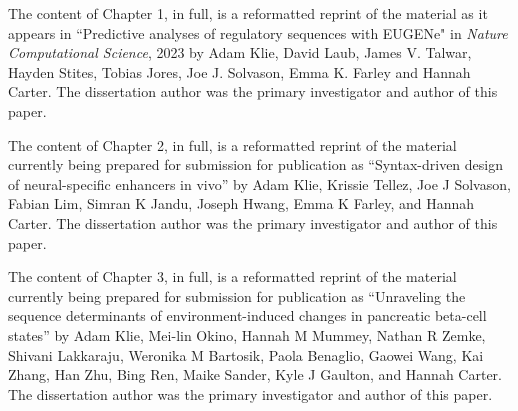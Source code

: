 \documentclass[11pt]{formatting-template}
\begin{document}

\tableofcontents
\listoffigures
\listoftables

\begin{acknowledgements}

	The content of Chapter 1, in full, is a reformatted reprint of the material as it appears in “Predictive analyses of regulatory sequences with EUGENe" in \textit{Nature Computational Science}, 2023 by Adam Klie, David Laub, James V. Talwar, Hayden Stites, Tobias Jores, Joe J. Solvason, Emma K. Farley and Hannah Carter. The dissertation author was the primary investigator and author of this paper.

	The content of Chapter 2, in full, is a reformatted reprint of the material currently being prepared for submission for publication as “Syntax-driven design of neural-specific enhancers in vivo'' by Adam Klie, Krissie Tellez, Joe J Solvason, Fabian Lim, Simran K Jandu, Joseph Hwang, Emma K Farley, and Hannah Carter. The dissertation author was the primary investigator and author of this paper.

	The content of Chapter 3, in full, is a reformatted reprint of the material currently being prepared for submission for publication as “Unraveling the sequence determinants of environment-induced changes in pancreatic beta-cell states'' by Adam Klie, Mei-lin Okino, Hannah M Mummey, Nathan R Zemke, Shivani Lakkaraju, Weronika M Bartosik, Paola Benaglio, Gaowei Wang, Kai Zhang, Han Zhu, Bing Ren, Maike Sander, Kyle J Gaulton, and Hannah Carter. The dissertation author was the primary investigator and author of this paper.

\end{acknowledgements}
\end{document}
